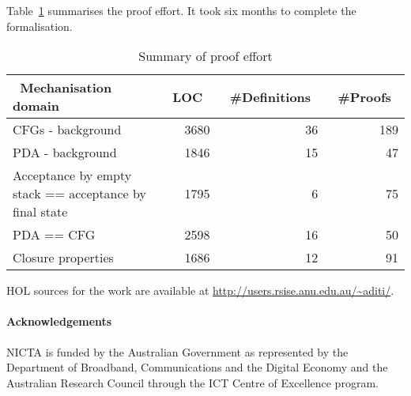 Table~\ref{tab:numbers} summarises the proof effort. It took six
months to complete the formalisation.
\begin{table}[!ht]
\begin{center}
\begin{tabular}{|l|r|r|r|}
  \hline
  ~\textbf{Mechanisation domain}~&~\textbf{LOC}~&~\textbf{\#Definitions}~&~\textbf{\#Proofs}~\\
  \hline
  CFGs - background       & 3680 & 36 & 189 \\
  \hline
  PDA - background        & 1846 & 15 & 47 \\
  \hline
  Acceptance by empty stack == acceptance by final state & 1795 & 6 & 75 \\
  \hline
  PDA == CFG & 2598 & 16 & 50\\
  \hline
  Closure properties & 1686 & 12 & 91\\
  \hline
\end{tabular}
\end{center}
\caption{Summary of proof effort}
\label{tab:numbers}
\end{table}

HOL sources for the work are available at
\url{http://users.rsise.anu.edu.au/~aditi/}.

\paragraph{Acknowledgements}
NICTA is funded by the Australian Government as represented by the
Department of Broadband, Communications and the Digital Economy and
the Australian Research Council through the ICT Centre of Excellence
program.


